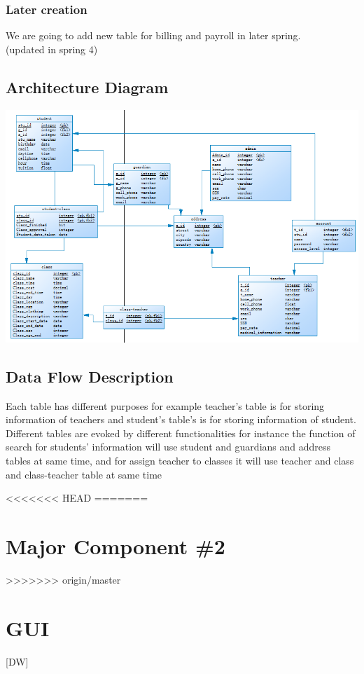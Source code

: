 \subsubsection{Later creation}
We are going to add new table for billing and payroll in later spring.\\
(updated in spring 4)\\

\subsection{ Architecture  Diagram}
\includegraphics[scale=0.8]{pics/database.png}\\


\subsection{Data Flow Description}
Each table has different purposes for example teacher's table is for storing information of teachers and student's table's is for storing information of student. Different tables are evoked by different functionalities for instance the function of search for students' information will use student and guardians and address tables at same time, and for assign teacher to classes it will use teacher and class and class-teacher table at same time

<<<<<<< HEAD
=======
\section{Major Component \#2 }
>>>>>>> origin/master

\section{GUI}
[DW]
